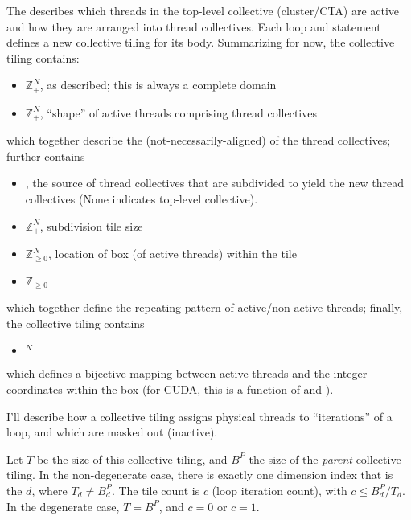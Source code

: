 \filbreak
{}

The  describes which threads in the top-level collective (cluster/CTA) are active and how they are arranged into thread collectives.
Each  loop and  statement defines a new collective tiling for its body.
Summarizing for now, the collective tiling contains:
\begin{itemize}
  \item {} $\mathbb{Z}^N_+$, as described; this is always a complete domain
  \item {} $\mathbb{Z}^N_+$, ``shape'' of active threads comprising thread collectives
\end{itemize}
\filbreak
which together describe the (not-necessarily-aligned)  of the thread collectives; further contains
\begin{itemize}
  \item {} , the source of thread collectives that are subdivided to yield the new thread collectives (None indicates top-level collective).
  \filbreak
  \item {} $\mathbb{Z}^N_+$, subdivision tile size
  \filbreak
  \item {} $\mathbb{Z}^N_{\ge 0}$, location of box (of active threads) within the tile
  \filbreak
  \item {} $\mathbb{Z}_{\ge 0}$
\end{itemize}
which together define the repeating pattern of active/non-active threads; finally, the collective tiling contains
\filbreak
\begin{itemize}
  \item {} $^N$
\end{itemize}
which defines a bijective mapping between active threads and the integer coordinates within the box (for CUDA, this is a function of  and ).

\filbreak
{}

I'll describe how a collective tiling assigns physical threads to ``iterations'' of a  loop, and which are masked out (inactive).

\filbreak
{} Let $T$ be the  size of this collective tiling, and $B^P$ the  size of the \textit{parent} collective tiling.
In the non-degenerate case, there is exactly one dimension index that is the  $d$, where $T_d \ne B^P_d$.
The tile count is $c$ (loop iteration count), with $c \le B^P_d / T_d$.
In the degenerate case, $T = B^P$, and $c = 0$ or $c = 1$.


